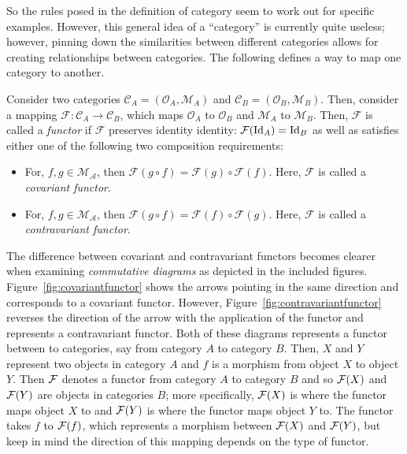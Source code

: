 \documentclass[../sean_thesis.tex]{subfiles}
\begin{document}
So the rules posed in the definition of category seem to work out for specific examples. However, this general idea of a ``category'' is currently quite useless; however, pinning down the similarities between different categories allows for creating relationships between categories. The following defines a way to map one category to another.

\begin{definition}[Functor]
\label{def:functor}
	Consider two categories $\mathcal{C}_A = (\mathcal{O}_A, \mathcal{M}_A)$ and $\mathcal{C}_B = (\mathcal{O}_B, \mathcal{M}_B)$. Then, consider a mapping $\mathcal{F}: \mathcal{C}_A \to \mathcal{C}_B$, which maps $\mathcal{O}_A$ to $\mathcal{O}_B$ and $\mathcal{M}_A$ to $\mathcal{M}_B$. Then, $\mathcal{F}$ is called a \emph{functor} if $\mathcal{F}$ preserves identity identity: $\mathcal{F}(\operatorname{Id}_A) = \operatorname{Id}_B$ as well as satisfies either one of the following two composition requirements:
	\vspace{-\varparskip}
	\begin{itemize}
		\item For, $f,g \in \mathcal{M_A}$, then $\mathcal{F}(g\circ f) = \mathcal{F}(g) \circ \mathcal{F}(f)$. Here, $\mathcal{F}$ is called a \emph{covariant functor}.
		\item  For, $f,g \in \mathcal{M_A}$, then $\mathcal{F}(g\circ f) = \mathcal{F}(f) \circ \mathcal{F}(g)$. Here, $\mathcal{F}$ is called a \emph{contravariant functor}.
	\end{itemize}
\end{definition}


The difference between covariant and contravariant functors becomes clearer when examining \emph{commutative diagrams} as depicted in the included figures. Figure~\ref{fig:covariantfunctor} shows the arrows pointing in the same direction and corresponds to a covariant functor. However, Figure~\ref{fig:contravariantfunctor} reverses the direction of the arrow with the application of the functor and represents a contravariant functor. Both of these diagrams represents a functor between to categories, say from category $A$ to category $B$. Then, $X$ and $Y$ represent two objects in category $A$ and $f$ is a morphism from object $X$ to object $Y$. Then $\mathcal{F}$ denotes a functor from category $A$ to category $B$ and so $\mathcal{F}(X)$ and $\mathcal{F}(Y)$ are objects in categories $B$; more specifically, $\mathcal{F}(X)$ is where the functor maps object $X$ to and $\mathcal{F}(Y)$ is where the functor maps object $Y$ to. The functor takes $f$ to $\mathcal{F}(f)$, which represents a morphism between $\mathcal{F}(X)$ and $\mathcal{F}(Y)$, but keep in mind the direction of this mapping depends on the type of functor.
\end{document}
